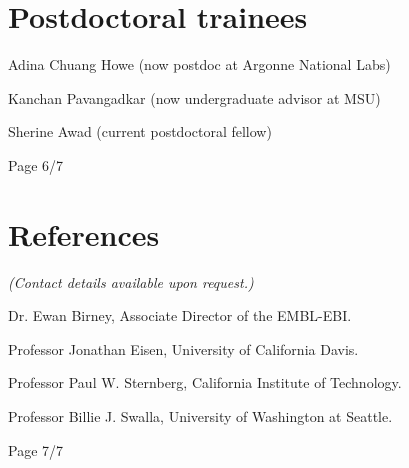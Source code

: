 \documentclass[margin,line]{resume}
\begin{document}
\begin{resume}
\section{\mysidestyle Postdoctoral trainees}

\begin{list1}
\item[] Adina Chuang Howe (now postdoc at Argonne National Labs)
\item[] Kanchan Pavangadkar (now undergraduate advisor at MSU)
\item[] Sherine Awad (current postdoctoral fellow)
\end{list1}


\vspace{2cm}
{\centerline {Page 6/7}}

\newpage

\section{\mysidestyle References}

{\em (Contact details available upon request.)}

Dr. Ewan Birney, Associate Director of the EMBL-EBI.

Professor Jonathan Eisen, University of California Davis.

Professor Paul W. Sternberg, California Institute of Technology.

Professor Billie J. Swalla, University of Washington at Seattle.

\vspace{2cm}
{\centerline {Page 7/7}}

\end{resume}
\end{document}
